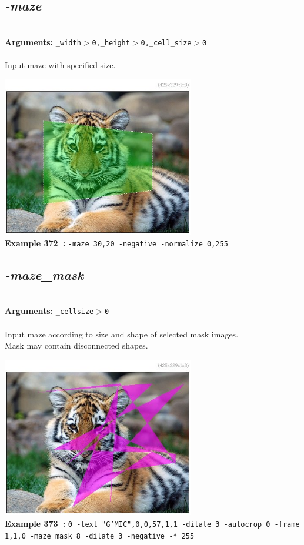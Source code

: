 \documentclass[a4paper,11pt,twoside]{book}
\begin{document}
\subsection{\emph{-maze} }\vspace*{-0.5em}
~\\\textbf{Arguments: } 
{\small \texttt{\_width$>$0,\_height$>$0,\_cell\_size$>$0}}\\~\\
Input maze with specified size.
\begin{center}\includegraphics[keepaspectratio=true,height=7cm,width=\textwidth]{img/gmic_def372.jpg}\\
{\footnotesize \textbf{Example 372~:} \texttt{-maze 30,20 -negative -normalize 0,255}}
\end{center}

\subsection{\emph{-maze\_mask} }\vspace*{-0.5em}
~\\\textbf{Arguments: } 
{\small \texttt{\_cellsize$>$0}}\\~\\
Input maze according to size and shape of selected mask images.
~\\Mask may contain disconnected shapes.
\begin{center}\includegraphics[keepaspectratio=true,height=7cm,width=\textwidth]{img/gmic_def373.jpg}\\
{\footnotesize \textbf{Example 373~:} \texttt{0 -text "G'MIC",0,0,57,1,1 -dilate 3 -autocrop 0 -frame 1,1,0 -maze\_mask 8 -dilate 3 -negative -* 255}}
\end{center}
\end{document}
